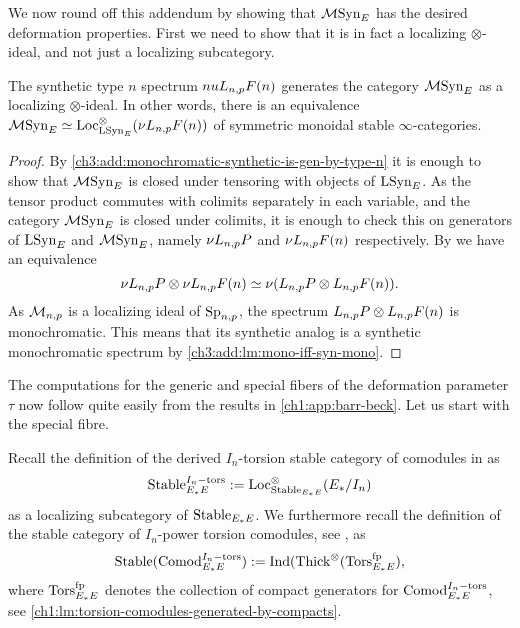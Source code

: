 We now round off this addendum by showing that $\mathcal{M}\mathrm{Syn}_{E}$ has the desired deformation properties. First we need to show that it is in fact a localizing $\otimes$-ideal, and not just a localizing subcategory. 

\begin{lemma}
    The synthetic type $n$ spectrum $nu L_{n,p} F(n)$ generates the category $\mathcal{M}\mathrm{Syn}_{E}$ as a localizing $\otimes$-ideal. In other words, there is an equivalence $\mathcal{M}\mathrm{Syn}_{E} \simeq \operatorname{Loc}_{\mathrm{LSyn}_{E}}^\otimes(\nu L_{n,p} F(n))$ of symmetric monoidal stable $\infty$-categories. 
\end{lemma}
\begin{proof}
    By \cref{ch3:add:monochromatic-synthetic-is-gen-by-type-n} it is enough to show that $\mathcal{M}\mathrm{Syn}_{E}$ is closed under tensoring with objects of $\mathrm{LSyn}_{E}$. As the tensor product commutes with colimits separately in each variable, and the category $\mathcal{M}\mathrm{Syn}_{E}$ is closed under colimits, it is enough to check this on generators of $\mathrm{LSyn}_{E}$ and $\mathcal{M}\mathrm{Syn}_{E}$, namely $\nu L_{n,p} P$ and $\nu L_{n,p} F(n)$ respectively. By \cite[4.24]{pstragowski_2022} we have an equivalence 
    \[\nu L_{n,p} P \otimes \nu L_{n,p} F(n) \simeq \nu(L_{n,p} P \otimes L_{n,p} F(n)).\]
    As $\mathcal{M}_{n,p}$ is a localizing ideal of $\mathrm{Sp}_{n,p}$, the spectrum $L_{n,p} P \otimes L_{n,p} F(n)$ is monochromatic. This means that its synthetic analog is a synthetic monochromatic spectrum by \cref{ch3:add:lm:mono-iff-syn-mono}. 
\end{proof}

The computations for the generic and special fibers of the deformation parameter $\tau$ now follow quite easily from the results in \cref{ch1:app:barr-beck}. Let us start with the special fibre. 

Recall the definition of the derived $I_n$-torsion stable category of comodules in \cite[2.4]{barthel-heard-valenzuela_2020} as 
\[\mathrm{Stable}_{E_*E}^{I_n-\mathrm{tors}} := \operatorname{Loc}_{\mathrm{Stable}_{E_*E}}^\otimes(E_{*}/I_n)\] 
as a localizing subcategory of $\mathrm{Stable}_{E_*E}$. We furthermore recall the definition of the stable category of $I_n$-power torsion comodules, see \cite[3.5]{barthel-heard-valenzuela_2020}, as 
\[\mathrm{Stable}(\mathrm{Comod}_{E_*E}^{I_n-\mathrm{tors}}) := \operatorname{Ind}(\operatorname{Thick}^\otimes(\mathrm{Tors}_{E_*E}^{\mathrm{fp}}),\]
where $\mathrm{Tors}_{E_*E}^{\mathrm{fp}}$ denotes the collection of compact generators for $\mathrm{Comod}_{E_*E}^{I_n-\mathrm{tors}}$, see \cref{ch1:lm:torsion-comodules-generated-by-compacts}. 

